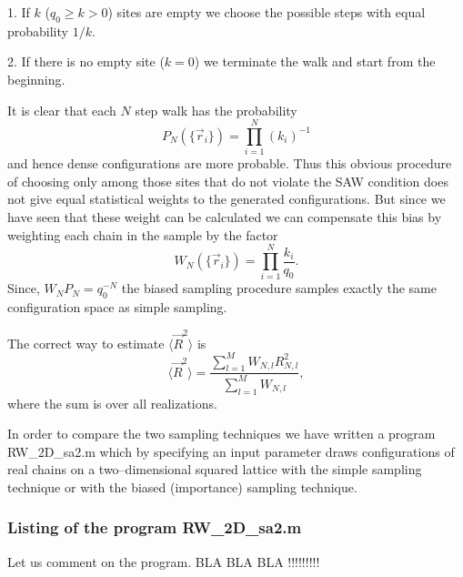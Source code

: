 1. If $k$ ($q_0 \ge k >0$) sites are empty we choose the possible 
steps with equal probability $1/k$.

2. If there is no empty site ($k=0$) we terminate the walk and 
start from the beginning.

It is clear that each $N$ step walk has the probability
\begin{equation*}
P_N(\{ \vec{r}_i \}) = \prod_{i=1}^N (k_i)^{-1}
\end{equation*}
and hence dense configurations are more probable. Thus this 
obvious procedure of choosing only among those  sites that do not 
violate the SAW condition does not give equal statistical weights
to the generated configurations. But since we have seen that these 
weight can be calculated we can compensate this bias by weighting 
each chain in the sample by the factor
\begin{equation*}
W_N(\{ \vec{r}_i \}) =  \prod_{i=1}^N \frac{k_i}{q_0}.
\end{equation*}
Since, $W_N P_N = q_0^{-N}$ the biased sampling procedure samples 
exactly the same configuration space as simple sampling.

The correct way to estimate $\langle \vec{R}^2 \rangle$ is
\begin{equation*}
\langle \vec{R}^2 \rangle = \frac{\sum_{l=1}^M W_{N,l} R^2_{N,l}}
                               {\sum_{l=1}^M W_{N,l}},
\end{equation*}
where the sum is over all realizations.

In order to compare the two sampling techniques we have written a 
program {\sf RW\_2D\_sa2.m} which by specifying an input parameter
draws configurations of real chains on a two--dimensional squared lattice 
with the simple sampling 
technique or with the biased (importance) sampling technique.



\subsubsection{Listing of the program {\sf RW\_2D\_sa2.m}}

Let us comment on the program. BLA BLA BLA !!!!!!!!!

